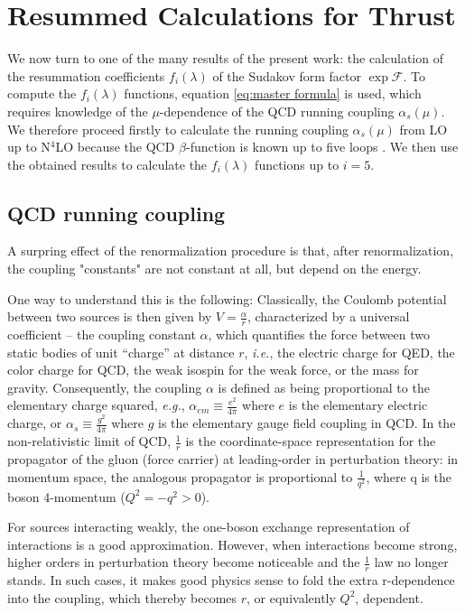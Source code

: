 \documentclass[../Tesi_Jiahao_Miao_986136.tex]{subfiles}
\begin{document}
\chapter{Resummed Calculations for Thrust}\label{ch:calculations}

We now turn to one of the many results of the present work: the calculation of the resummation coefficients $f_i(\lambda)$ of the
Sudakov form factor $\exp{\mathcal{F}}$. To compute the $f_i(\lambda)$ functions, equation \cref{eq:master formula} is used, which
requires knowledge of the $\mu$-dependence of the QCD running coupling $\alpha_s(\mu)$.
We therefore proceed firstly to calculate the running coupling $\alpha_s(\mu)$ from LO up to N$^4$LO because the QCD $\beta$-function is known up to five loops \cite{Herzog_2017}. 
We then use the obtained results to calculate the $f_i(\lambda)$ functions up to $i = 5$.

\section{QCD running coupling} \label{sec:QCD_running_coupling}

A surpring effect of the renormalization procedure is that, after renormalization, the coupling "constants" are not constant
at all, but depend on the energy.

One way to understand this is the following: Classically, the Coulomb potential between two sources is then given by $V = \frac{\alpha}{r}$, 
characterized by a universal coefficient -- the coupling constant $\alpha$, which 
quantifies the force between two static bodies of unit “charge” at distance $r$,
\textit{i.e.}, the electric charge for QED, the color charge for QCD, the weak isospin
for the weak force, or the mass for gravity. Consequently, the coupling $\alpha$ is defined
as being proportional to the elementary charge squared, \textit{e.g.}, $\alpha_{em} \equiv \frac{e^2}{4\pi}$ where 
$e$ is the elementary electric charge, or $\alpha_s \equiv \frac{g^2}{4\pi}$ where $g$ is the elementary gauge field
coupling in QCD.
In the non-relativistic limit of QCD, $\frac{1}{r}$ is the coordinate-space representation
for the propagator of the gluon (force carrier) at leading-order in perturbation
theory: in momentum space, the analogous propagator is proportional to $\frac{1}{q^2}$, where q is
the boson 4-momentum ($Q^2=-q^2>0$).

For sources interacting weakly, the one-boson exchange representation of interactions
is a good approximation. However, when interactions become strong, higher orders in perturbation theory become noticeable and the
$\frac{1}{r}$ law no longer stands. In such cases, it makes good physics sense to fold the extra r-dependence
into the coupling, which thereby becomes $r$, or equivalently $Q^2$, dependent.
\end{document}
